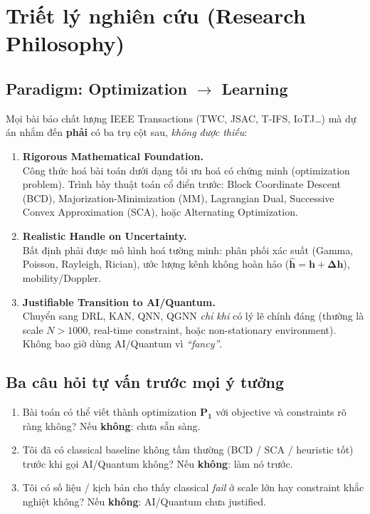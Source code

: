 \documentclass[11pt,a4paper]{article}
\begin{document}
\section{Triết lý nghiên cứu (Research Philosophy)}

\subsection{Paradigm: Optimization $\rightarrow$ Learning}

Mọi bài báo chất lượng IEEE Transactions (TWC, JSAC, T-IFS, IoTJ\dots) mà dự án nhắm đến \textbf{phải} có ba trụ cột sau, \textit{không được thiếu}:

\begin{enumerate}
  \item \textbf{Rigorous Mathematical Foundation.} \\
        Công thức hoá bài toán dưới dạng tối ưu hoá có chứng minh (optimization problem). Trình bày thuật toán cổ điển trước: Block Coordinate Descent (BCD), Majorization-Minimization (MM), Lagrangian Dual, Successive Convex Approximation (SCA), hoặc Alternating Optimization.
  \item \textbf{Realistic Handle on Uncertainty.} \\
        Bất định phải được mô hình hoá tường minh: phân phối xác suất (Gamma, Poisson, Rayleigh, Rician), ước lượng kênh không hoàn hảo ($\hat{\mathbf{h}} = \mathbf{h} + \boldsymbol{\Delta h}$), mobility/Doppler.
  \item \textbf{Justifiable Transition to AI/Quantum.} \\
        Chuyển sang DRL, KAN, QNN, QGNN \textit{chỉ khi} có lý lẽ chính đáng (thường là scale $N > 1000$, real-time constraint, hoặc non-stationary environment). Không bao giờ dùng AI/Quantum vì \textit{``fancy''}.
\end{enumerate}

\subsection{Ba câu hỏi tự vấn trước mọi ý tưởng}

\begin{rulebox}
\begin{enumerate}
  \item Bài toán có thể viết thành optimization $\mathbf{P_1}$ với objective và constraints rõ ràng không? Nếu \textbf{không}: chưa sẵn sàng.
  \item Tôi đã có classical baseline không tầm thường (BCD / SCA / heuristic tốt) trước khi gọi AI/Quantum không? Nếu \textbf{không}: làm nó trước.
  \item Tôi có số liệu / kịch bản cho thấy classical \textit{fail} ở scale lớn hay constraint khắc nghiệt không? Nếu \textbf{không}: AI/Quantum chưa justified.
\end{enumerate}
\end{rulebox}
\end{document}
